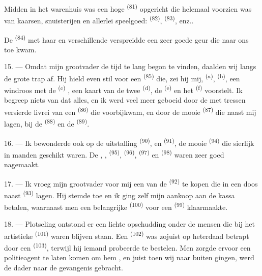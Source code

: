 Midden in het warenhuis was een hoge  \textsuperscript{(81)} opgericht die
helemaal voorzien was van kaarsen, snuisterijen en allerlei speelgoed: 
\textsuperscript{(82)},  \textsuperscript{(83)}, enz..

De  \textsuperscript{(84)} met haar  en verschillende
 verspreidde een zeer goede geur die naar ons toe kwam.

\VUsaut{3.4mm}
\VUsaut{2.8mm}

15. --- Omdat mijn grootvader de tijd te lang begon te vinden, daalden wij langs de grote trap
af. Hij hield even stil voor een  \textsuperscript{(85)} die, zei
hij mij,  \textsuperscript{(a)}, 
\textsuperscript{(b)}, een windroos met de  \textsuperscript{(c)}
, een kaart van de twee
 \textsuperscript{(d)}, de 
\textsuperscript{(e)} en het  \textsuperscript{(f)} voorstelt. Ik begreep
niets van dat alles, en ik werd veel meer geboeid door de met tressen versierde livrei van een
 \textsuperscript{(86)} die voorbijkwam, en door de mooie 
\textsuperscript{(87)} die naast mij lagen, bij de 
\textsuperscript{(88)} en de
 \textsuperscript{(89)}.

16. --- Ik bewonderde ook op de uitstalling  \textsuperscript{(90)}, en
 \textsuperscript{(91)}, de mooie
 \textsuperscript{(94)} die sierlijk in manden geschikt
waren. De , ,  \textsuperscript{(95)},
 \textsuperscript{(96)},
 \textsuperscript{(97)} en 
\textsuperscript{(98)} waren zeer goed nagemaakt.

\VUsaut{4.4mm}
\VUsaut{2.8mm}

17. --- Ik vroeg mijn grootvader voor mij een van de 
\textsuperscript{(92)} te kopen die in een doos naast 
\textsuperscript{(93)} lagen. Hij stemde toe en ik ging zelf mijn aankoop aan de kassa
betalen, waarnaast men een belangrijke  \textsuperscript{(100)} voor een
 \textsuperscript{(99)} klaarmaakte.

18. --- Plotseling ontstond er een lichte opschudding onder de mensen die bij het artistieke
 \textsuperscript{(101)} waren blijven staan. Een
 \textsuperscript{(102)} was zojuist op heterdaad betrapt door een
 \textsuperscript{(103)}, terwijl hij iemand probeerde te
bestelen. Men zorgde ervoor een politieagent te laten komen om hem
, en juist toen wij naar buiten gingen, werd de dader naar
de gevangenis gebracht.
\VUsaut{6.0mm}
\VUfilet{22mm}
